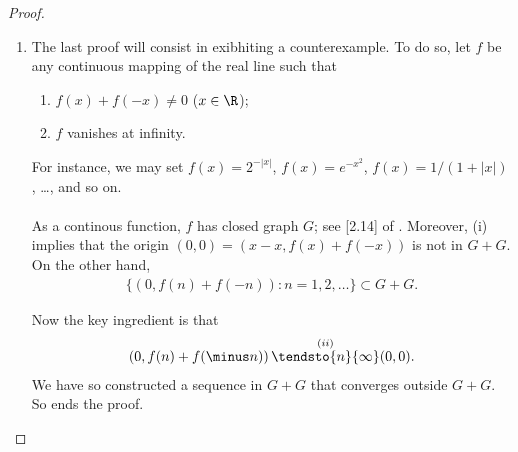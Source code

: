 \begin{proof}
\begin{enumerate}
%
To do so, let the variable $\mathit{a}$ range over $A$: %
Every set $a+B$ is closed as well: see [1.7] of \cite{FA}. %
%
Trivially, $a+B \neq c$: By [1.10] of \cite{FA}, %
there so exists $V=V(a)$ a neighborhood of the origin such that %
%
\begin{align}
  (a+B + V) \cap (c+V) = \emptyset.
\end{align}
%
Moreover, there are finitely many $a+V$, say $a_1 + V_1, a_2 + V_2, \dots$, %
whose union $U$ contains the compact set $A$. Therefore, %
%
\begin{align}\label{U + B encloses A + B}
  A+B \subset U + B.
\end{align}
%
Now define %
\begin{align}
  W \triangleq V_1 \cap V_2 \cap \cdots, 
\end{align}
%
so that 
%
\begin{align}
  (a_i + B + V_i) \cap (c + W) = \emptyset \quad (i = 1, 2, \dots).
\end{align}
%
This shows that $c$ is not in the closure of $U+B$. %
Finally, we use (\ref{U + B encloses A + B}) to conclude that $c$ %
is not in $\overline{A+B}$ either; which achieves the proof. \\
\\
\textbf{Corollary}: if $B$ is the closure of a set $S$, then %
%
\begin{align}
  A+B \subset \overline{A+S} \subset \overline{A+B} = A + B
\end{align}
%
by (b) of [1.13] of \cite{FA} (since $A$ is closed; %
see [1.12] from the same source). %
This special case will occur in the proof of exercise 15 of chapter 2. %
%
\item The last proof will consist in exibhiting a counterexample. %
To do so, let $f$ be any continuous mapping of the real line such that %
\renewcommand{\labelenumii}{(\roman{enumii})} 
\begin{enumerate}
  \item $f(x) + f(\minus x) \neq 0$ \quad ($x \in \R$);
  \item $f$ vanishes at infinity. 
\end{enumerate}
For instance, we may set %
%
  $f(x) = 2^{\minus |x|}$, %
  $f(x) = e^{\minus x^2}$, %
  $f(x) = 1/(1+|x|)$, \dots, %
%
and so on. \\
\\
As a continous function, $f$ has closed graph $G$; see [2.14] of \cite{FA}. %
%
Moreover, (i) implies that the origin %
%
  $(0, 0)= \left(x-x, f(x)+ f(\minus x)\right)$ %
% 
is not in $G+G$. %
%
On the other hand, 
%
\begin{align}
  \{ \left(0, f(n) + f(\minus n)\right): n=1, 2, \dots\} \subset G + G.
\end{align}
%

%
Now the key ingredient is that %
%
\begin{align}
  \left(0, f(n)+f(\minus n)\right) \overset{(ii)}{\tendsto{n}{\infty}} (0, 0). 
\end{align}
%
We have so constructed a sequence in $G+G$ that converges outside $G+G$. %
So ends the proof.
\end{enumerate}
\end{proof}

